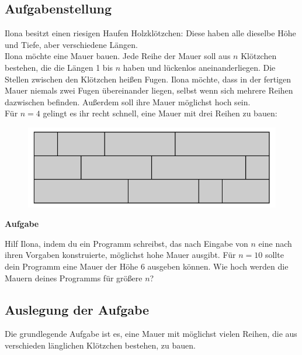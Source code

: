 \documentclass[a4paper,12pt]{article}
\begin{document}
\subsection{Aufgabenstellung}
Ilona besitzt einen riesigen Haufen Holzklötzchen: Diese haben alle dieselbe Höhe und Tiefe,
aber verschiedene Längen. \\
Ilona möchte eine Mauer bauen. Jede Reihe der Mauer soll aus $n$ Klötzchen bestehen, die die
Längen 1 bis $n$ haben und lückenlos aneinanderliegen. Die Stellen zwischen den Klötzchen heißen
Fugen. Ilona möchte, dass in der fertigen Mauer niemals zwei Fugen übereinander liegen,
selbst wenn sich mehrere Reihen dazwischen befinden. Außerdem soll ihre Mauer möglichst
hoch sein. \\
Für $n = 4$ gelingt es ihr recht schnell, eine Mauer mit drei Reihen zu bauen:
\begin{figure}[H]
    \includegraphics[width=0.7\linewidth]{Bilder/Aufgabe1/Aufgabenstellung_BeispielMauer.png}
\end{figure}
\begin{large}
    \textbf{Aufgabe} \\
\end{large}
Hilf Ilona, indem du ein Programm schreibst, das nach Eingabe von $n$ eine nach ihren Vorgaben
konstruierte, möglichst hohe Mauer ausgibt. Für $n = 10$ sollte dein Programm eine Mauer der
Höhe 6 ausgeben können. Wie hoch werden die Mauern deines Programms für größere $n$?

\subsection{Auslegung der Aufgabe}
Die grundlegende Aufgabe ist es, eine Mauer mit möglichst vielen Reihen, die aus verschieden länglichen Klötzchen bestehen, zu bauen.
\end{document}
